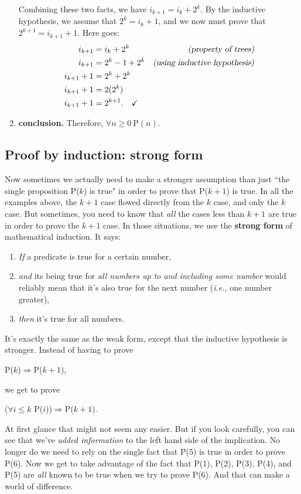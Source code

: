 \begin{enumerate}
Combining these two facts, we have $i_{k+1} = i_k + 2^k$. By the inductive
hypothesis, we assume that $2^k = i_k + 1$, and we now must prove that
$2^{k+1} = i_{k+1} + 1$. Here goes:
\begin{align*}
i_{k+1} &= i_k + 2^k &\textsl{(property of trees)} \\
i_{k+1} &= 2^k - 1 + 2^k &\textsl{(using inductive hypothesis)} \\
i_{k+1} + 1 &= 2^k + 2^k \\
i_{k+1} + 1 &= 2(2^k) \\
i_{k+1} + 1 &= 2^{k+1}. \quad \checkmark
\end{align*}
\item \textbf{conclusion.} Therefore, $\forall n\geq0 \ \text{P}(n)$.
\end{enumerate}

\subsection{Proof by induction: strong form}

Now sometimes we actually need to make a stronger assumption than just
``the single proposition P($k$) is true" in order to prove that P($k+1$) is
true. In all the examples above, the $k+1$ case flowed directly from the
$k$ case, and only the $k$ case. But sometimes, you need to know that
\textit{all} the cases less than $k+1$ are true in order to prove the $k+1$
case. In those situations, we use the \textbf{strong form} of mathematical
induction. It says:

\begin{enumerate}
\item \label{basecasestrong} \textit{If} a predicate is true for a certain number,
\item \label{inductivestepstrong} \textit{and} its being true for \textit{all
numbers up to and including some number} would reliably mean that it's also
true for the next number (\textit{i.e.}, one number greater), 
\item \textit{then} it's true for all numbers.
\end{enumerate}
It's exactly the same as the weak form, except that the inductive
hypothesis is stronger. Instead of having to prove
\begin{center}
P($k$)$\Rightarrow$P($k+1$),
\end{center}
we get to prove
\begin{center}
($\forall i\leq k$ P($i$))$\Rightarrow$P($k+1$).
\end{center}
At first glance that might not seem any easier. But if you look carefully,
you can see that we've \textit{added information} to the left hand side of
the implication.  No longer do we need to rely on the single fact that P(5)
is true in order to prove P(6). Now we get to take advantage of the fact
that P(1), P(2), P(3), P(4), and P(5) are \textit{all} known to be true
when we try to prove P(6). And that can make a world of difference.


